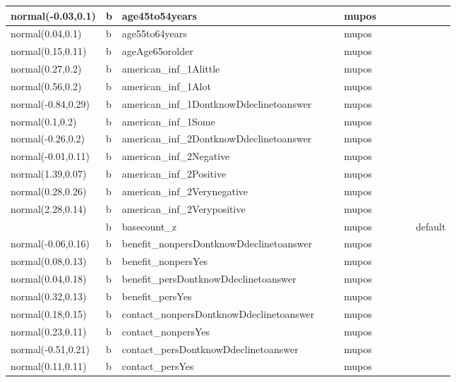 \documentclass[
]{book}
\theoremstyle{definition}
\theoremstyle{definition}
\theoremstyle{definition}
\theoremstyle{definition}
\theoremstyle{remark}
\begin{document}
\begin{table}
\begin{tabular}[t]{l|l|l|l|l|l|l|l|l|l}
\hline
normal(-0.03,0.1) & b & age45to54years &  &  & mupos &  &  &  & \\
\hline
normal(0.04,0.1) & b & age55to64years &  &  & mupos &  &  &  & \\
\hline
normal(0.15,0.11) & b & ageAge65orolder &  &  & mupos &  &  &  & \\
\hline
normal(0.27,0.2) & b & american\_inf\_1Alittle &  &  & mupos &  &  &  & \\
\hline
normal(0.56,0.2) & b & american\_inf\_1Alot &  &  & mupos &  &  &  & \\
\hline
normal(-0.84,0.29) & b & american\_inf\_1DontknowDdeclinetoanswer &  &  & mupos &  &  &  & \\
\hline
normal(0.1,0.2) & b & american\_inf\_1Some &  &  & mupos &  &  &  & \\
\hline
normal(-0.26,0.2) & b & american\_inf\_2DontknowDdeclinetoanswer &  &  & mupos &  &  &  & \\
\hline
normal(-0.01,0.11) & b & american\_inf\_2Negative &  &  & mupos &  &  &  & \\
\hline
normal(1.39,0.07) & b & american\_inf\_2Positive &  &  & mupos &  &  &  & \\
\hline
normal(0.28,0.26) & b & american\_inf\_2Verynegative &  &  & mupos &  &  &  & \\
\hline
normal(2.28,0.14) & b & american\_inf\_2Verypositive &  &  & mupos &  &  &  & \\
\hline
 & b & basecount\_z &  &  & mupos &  &  &  & default\\
\hline
normal(-0.06,0.16) & b & benefit\_nonpersDontknowDdeclinetoanswer &  &  & mupos &  &  &  & \\
\hline
normal(0.08,0.13) & b & benefit\_nonpersYes &  &  & mupos &  &  &  & \\
\hline
normal(0.04,0.18) & b & benefit\_persDontknowDdeclinetoanswer &  &  & mupos &  &  &  & \\
\hline
normal(0.32,0.13) & b & benefit\_persYes &  &  & mupos &  &  &  & \\
\hline
normal(0.18,0.15) & b & contact\_nonpersDontknowDdeclinetoanswer &  &  & mupos &  &  &  & \\
\hline
normal(0.23,0.11) & b & contact\_nonpersYes &  &  & mupos &  &  &  & \\
\hline
normal(-0.51,0.21) & b & contact\_persDontknowDdeclinetoanswer &  &  & mupos &  &  &  & \\
\hline
normal(0.11,0.11) & b & contact\_persYes &  &  & mupos &  &  &  & \\

\end{tabular}
\end{table}
\end{document}
